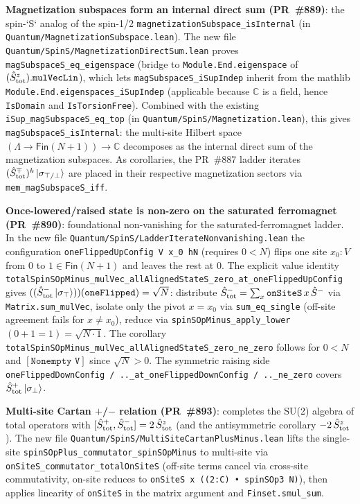 \documentclass[a4paper,11pt]{article}
\begin{document}
\textbf{Magnetization subspaces form an internal direct sum
(PR~\#889)}: the spin-`S` analog of the spin-1/2
\texttt{magnetizationSubspace\_isInternal} (in
\texttt{Quantum/MagnetizationSubspace.lean}). The new file
\texttt{Quantum/SpinS/MagnetizationDirectSum.lean} proves
\texttt{magSubspaceS\_eq\_eigenspace} (bridge to
\texttt{Module.End.eigenspace} of
$(\hat S^z_{\rm tot}).\texttt{mulVecLin}$), which lets
\texttt{magSubspaceS\_iSupIndep} inherit from the mathlib
\texttt{Module.End.eigenspaces\_iSupIndep} (applicable because
$\mathbb{C}$ is a field, hence \texttt{IsDomain} and
\texttt{IsTorsionFree}). Combined with the existing
\texttt{iSup\_magSubspaceS\_eq\_top} (in
\texttt{Quantum/SpinS/Magnetization.lean}), this gives
\texttt{magSubspaceS\_isInternal}: the multi-site Hilbert space
$(\Lambda\to\textsf{Fin}(N+1))\to\mathbb{C}$ decomposes as the
internal direct sum of the magnetization subspaces. As corollaries,
the PR~\#887 ladder iterates
$(\hat S^\mp_{\rm tot})^k\,|\sigma_{\top/\bot}\rangle$ are placed in
their respective magnetization sectors via
\texttt{mem\_magSubspaceS\_iff}.

\textbf{Once-lowered/raised state is non-zero on the saturated
ferromagnet (PR~\#890)}: foundational non-vanishing for the
saturated-ferromagnet ladder. In the new file
\texttt{Quantum/SpinS/LadderIterateNonvanishing.lean} the
configuration \texttt{oneFlippedUpConfig V x\_0 hN} (requires
$0<N$) flips one site $x_0:V$ from $0$ to $1\in\textsf{Fin}(N+1)$
and leaves the rest at $0$. The explicit value identity
\texttt{totalSpinSOpMinus\_mulVec\_allAlignedStateS\_zero\_at\_oneFlippedUpConfig}
gives $((\hat S^-_{\rm tot}\,|\sigma_\top\rangle))(\texttt{oneFlipped})=\sqrt{N}$:
distribute $\hat S^-_{\rm tot}=\sum_x\texttt{onSiteS}\,x\,\hat S^-$
via \texttt{Matrix.sum\_mulVec}, isolate only the pivot $x=x_0$ via
\texttt{sum\_eq\_single} (off-site agreement fails for
$x\neq x_0$), reduce via \texttt{spinSOpMinus\_apply\_lower}
$(0+1=1)=\sqrt{N\cdot 1}$. The corollary
\texttt{totalSpinSOpMinus\_mulVec\_allAlignedStateS\_zero\_ne\_zero}
follows for $0<N$ and $[\texttt{Nonempty V}]$ since
$\sqrt{N}>0$. The symmetric raising side
\texttt{oneFlippedDownConfig\,/\,..\_at\_oneFlippedDownConfig\,/\,..\_ne\_zero}
covers $\hat S^+_{\rm tot}\,|\sigma_\bot\rangle$.

\textbf{Multi-site Cartan \(+\)/\(-\) relation (PR~\#893)}: completes the
SU(2) algebra of total operators with
$[\hat S^+_{\rm tot}, \hat S^-_{\rm tot}] = 2\,\hat S^z_{\rm tot}$
(and the antisymmetric corollary $-2\,\hat S^z_{\rm tot}$). The
new file \texttt{Quantum/SpinS/MultiSiteCartanPlusMinus.lean}
lifts the single-site \texttt{spinSOpPlus\_commutator\_spinSOpMinus}
to multi-site via \texttt{onSiteS\_commutator\_totalOnSiteS}
(off-site terms cancel via cross-site commutativity, on-site reduces
to \texttt{onSiteS x ((2:C) • spinSOp3 N)}), then applies linearity
of \texttt{onSiteS} in the matrix argument and \texttt{Finset.smul\_sum}.
\end{document}
